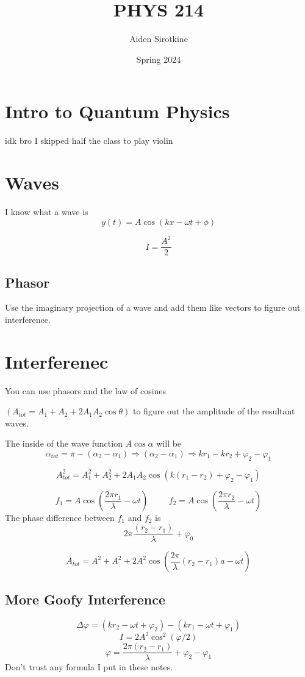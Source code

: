 \documentclass[fleqn]{report}
\date{Spring 2024}
\title{PHYS 214}
\author{Aiden Sirotkine}
\newcommand{\hp}{\hspace{1cm}}
\begin{document}
\pagestyle{fancy}
\maketitle
\tableofcontents
\clearpage

\chapter{Intro to Quantum Physics}
idk bro I skipped half the class to play violin

\chapter{Waves}
I know what a wave is
\[
y(t) = A \cos (kx - \omega t + \phi)
\]

\[
I = \frac{A^2}{2}
\]

\section{Phasor}
Use the imaginary projection of a wave and add them like vectors to figure out interference.


\chapter{Interferenec}
You can use phasors and the law of cosines 

$(A_{tot} = A_1 + A_2 + 2A_1 A_2 \cos \theta)$ to figure out the amplitude of the resultant waves.

The inside of the wave function $A \cos \alpha$ will be 
\[
\alpha_{tot} = \pi - (\alpha_2 - \alpha_1)
\Rightarrow
(\alpha_2 - \alpha_1)
\Rightarrow
kr_1 - kr_2 + \varphi_2 - \varphi_1
\]

\[
A_{tot}^2 = A_1^2 + A_2^2 + 2A_1 A_2 \cos (k(r_1 - r_2) + \varphi_2 - \varphi_1)
\]

\[
f_1 = A \cos (\frac{2 \pi r_1}{\lambda} -  \omega t)
\hp
f_2 = A \cos (\frac{2 \pi r_2}{\lambda} -  \omega t)
\]
The phase difference between $f_1$ and $f_2$ is
\[
2\pi \frac{(r_2 - r_1)}{\lambda} + \varphi_0
\]

\[
A_{tot} = A^2 + A^2 + 2 A^2 \cos ( \frac{2 \pi}{ \lambda} (r_2 - r_1)a - \omega t)
\]


\section{More Goofy Interference}
\[
\Delta \varphi = (kr_2 - \omega t + \varphi_2) - (kr_1 - \omega t + \varphi_1)
\]
\[
I = 2A^2 \cos^2( \varphi/2)
\]
\[
\varphi = \frac{2 \pi (r_2 - r_1)}{\lambda} + \varphi_2 - \varphi_1
\]
Don't trust any formula I put in these notes.
\end{document}
